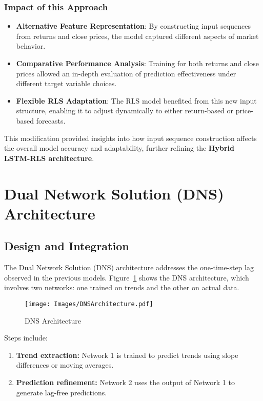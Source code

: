 \subsubsection{Impact of this Approach}

\begin{itemize}
    \item \textbf{Alternative Feature Representation}: By constructing input sequences \\from returns and close prices, the model captured different aspects of market behavior.  
    \item \textbf{Comparative Performance Analysis}: Training for both returns and close prices allowed an in-depth evaluation of prediction effectiveness under different target variable choices.  
    \item \textbf{Flexible RLS Adaptation}: The RLS model benefited from this new input structure, enabling it to adjust dynamically to either return-based or price-based forecasts.  
\end{itemize}

This modification provided insights into how input sequence construction affects the overall model accuracy and adaptability, further refining the \textbf{Hybrid LSTM-RLS architecture}.

\section{Dual Network Solution (DNS) Architecture}
\subsection{Design and Integration}
The Dual Network Solution (DNS) architecture addresses the one-time-step lag observed in the previous models. Figure~\ref{fig:DNSArch} shows the DNS architecture, which involves two networks: one trained on trends and the other on actual data.

\begin{figure}[h!]
    \centering
    \texttt{[image: Images/DNSArchitecture.pdf]} %
    \caption{DNS Architecture}
    \label{fig:DNSArch}
\end{figure}

Steps include:
\begin{enumerate}
    \item \textbf{Trend extraction:} Network 1 is trained to predict trends using slope differences or moving averages.
    \item \textbf{Prediction refinement:} Network 2 uses the output of Network 1 to generate lag-free predictions.
\end{enumerate}

